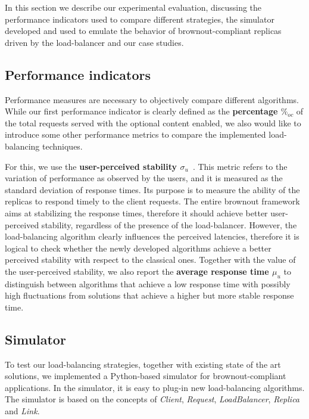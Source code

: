 In this section we describe our experimental evaluation, discussing
the performance indicators used to compare different strategies, the
simulator developed and used to emulate the behavior of
brownout-compliant replicas driven by the load-balancer and our case
studies.

\subsection{Performance indicators}

Performance measures are necessary to objectively compare different
algorithms. While our first performance indicator is clearly defined
as the \textbf{percentage $\%_{oc}$} of the total requests served with
the optional content enabled, we also would like to introduce some
other performance metrics to compare the implemented load-balancing
techniques.

For this, we use the \textbf{user-perceived stability
  $\sigma_u$}~\cite{GeograficalSASO}. This metric refers to the
variation of performance as observed by the users, and it is measured
as the standard deviation of response times. Its purpose is to measure
the ability of the replicas to respond timely to the client
requests. The entire brownout framework aims at stabilizing the
response times, therefore it should achieve better user-perceived
stability, regardless of the presence of the load-balancer. However,
the load-balancing algorithm clearly influences the perceived
latencies, therefore it is logical to check whether the newly
developed algorithms achieve a better perceived stability with respect
to the classical ones. Together with the value of the user-perceived
stability, we also report the \textbf{average response time $\mu_u$}
to distinguish between algorithms that achieve a low response time
with possibly high fluctuations from solutions that achieve a higher
but more stable response time.

\subsection{Simulator}

To test our load-balancing strategies, together with existing state of
the art solutions, we implemented a Python-based simulator for
brownout-compliant applications. In the simulator, it is easy to
plug-in new load-balancing algorithms. The simulator is based on the
concepts of \emph{Client}, \emph{Request}, \emph{LoadBalancer},
\emph{Replica} and \emph{Link}.

